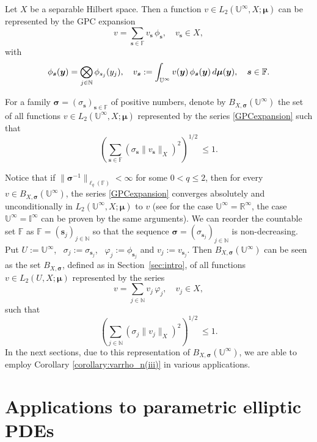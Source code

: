 \documentclass[11pt]{article}
\numberwithin{equation}{section}
\theoremstyle{definition}
\theoremstyle{remark}
\newcommand{\bs}{{\boldsymbol{s}}}
\newcommand{\by}{{\boldsymbol{y}}}
\newcommand{\bsigma}{{\boldsymbol{\sigma}}}
\newcommand{\bmu}{{\boldsymbol{\mu}}}
\newcommand{\rd}{{\rm d}}
\def\NN{{\mathbb N}}
\def\NN{{\mathbb N}}
\def\FF{{\mathcal F}}
\def\IIi{{\mathbb I}^\infty}
\def\UUi{{\mathbb U}^{\infty}}
\def\FF{{\mathcal F}}
\def\NN{{\mathbb N}}
\def\FF{{\mathbb F}}
\def\RRRi{{\mathbb R}^\infty}
\begin{document}
 Let $X$ be a separable Hilbert space. Then a function $v \in L_2(\UUi,X;\bmu)$ can be represented by the GPC expansion
 \begin{equation} \label{GPCexpansion}
 	v=\sum_{\bs\in\FF} v_\bs \,\phi_\bs, \quad v_\bs \in X,
 \end{equation}
 with
 \begin{equation*}
 	\phi_\bs(\by)=\bigotimes_{j \in \NN}\phi_{s_j}(y_j),\quad 
 	v_\bs:=\int_{\UUi} v(\by)\,\phi_\bs(\by)\, \rd\bmu (\by), \quad 
 	\bs \in \FF.
 \end{equation*}
 
    For a family $\bsigma=(\sigma_\bs)_{\bs \in \FF}$ of positive numbers, denote by $B_{X,\bsigma}(\UUi)$ the set of all functions $v \in L_2(\UUi,X;\bmu)$ represented by 
 	the series \eqref{GPCexpansion} such that
 	\begin{equation*} \label{sigma-summability}
        \left(\sum_{\bs\in\FF} (\sigma_\bs \|v_\bs\|_{X})^2\right)^{1/2} \ \le 1.
 	\end{equation*}
 	
{ Notice that if $\|\bsigma^{-1}\|_{\ell_q(\FF)} < \infty$ for some $0 <q \le 2$, then for every $v \in B_{X,\bsigma}(\UUi)$, the series \eqref{GPCexpansion} converges absolutely and unconditionally in 
 $L_2(\UUi,X;\bmu)$ to $v$ (see \cite[Lemma 3.1]{Dung22} for the case $\UUi = \RRRi$, the case $\UUi = \IIi$ can be proven by the same arguments).
We can reorder the countable set $\FF$ as $\FF = (\bs_j)_{j \in \NN}$ so that the sequence 
 $\bsigma= (\sigma_{\bs_j})_{j \in \NN}$ is non-decreasing. Put 
 $U:=\UUi$, \ $\sigma_j:=\sigma_{\bs_j}$, \ $\varphi_j:=\phi_{\bs_j}$ and $v_j:=v_{\bs_j}$.  Then $B_{X,\bsigma}(\UUi)$ can be seen as the set $B_{X,\bsigma}$, defined as in Section~\ref{sec:intro}, of all functions $v \in L_2(U,X;\bmu)$ represented by 
 the series 
 \begin{equation*} 
 	v= \sum_{j \in \NN}  v_j\,\varphi_j, \quad v_j \in X,
 \end{equation*}
  such that
 \begin{equation*} 
 	\left(\sum_{j \in \NN} (\sigma_j \|v_j\|_{X})^2\right)^{1/2} \ \le 1.
 \end{equation*}
 In the next sections, due to  this representation of $B_{X,\bsigma}(\UUi)$, we 
 are able to employ  Corollary \ref{corollary:varrho_n(iii)} in various applications.}
 
 
 	\section{Applications to parametric elliptic PDEs} 
 	\label{Applications to parametric PDEs with random inputs} 
 	
\end{document}
